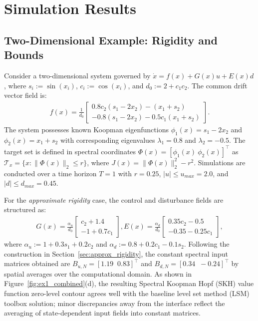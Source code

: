 \documentclass[letterpaper, 10 pt, conference]{ieeeconf}
\theoremstyle{plain}
\theoremstyle{definition}
\begin{document}
\section{Simulation Results}
\label{sec:simulations}


\subsection{Two-Dimensional Example: Rigidity and Bounds}
\label{sec:2D_example}

Consider a two-dimensional system governed by $\dot x = f(x) + G(x)u + E(x)d$, where $s_i := \sin(x_i)$, $c_i := \cos(x_i)$, and $d_0 := 2 + c_1 c_2$. The common drift vector field is:
\begin{align}
    f(x) = \frac{1}{d_0} 
    \begin{bmatrix} 
        0.8 c_2 (s_1 - 2x_2) - (x_1 + s_2) \\ 
        -0.8 (s_1 - 2x_2) - 0.5 c_1 (x_1 + s_2) 
    \end{bmatrix}.
\end{align}
The system possesses known Koopman eigenfunctions $\phi_1(x)=s_1 - 2x_2$ and $\phi_2(x)=x_1 + s_2$ with corresponding eigenvalues $\lambda_1=0.8$ and $\lambda_2=-0.5$. The target set is defined in spectral coordinates $\Phi(x) = [\phi_1(x)\ \phi_2(x)]^\top$ as $\mathcal{T}_x=\{x:\|\Phi(x)\|_2\le r\}$, where $J(x)=\|\Phi(x)\|_2^2-r^2$. Simulations are conducted over a time horizon $T=1$ with $r=0.25$, $|u|\le u_{max} = 2.0$, and $|d|\le d_{max} = 0.45$.

For the \textit{approximate rigidity} case, the control and disturbance fields are structured as:
\begin{align*}
    G(x) = \frac{\alpha_u}{d_0}
    \begin{bmatrix} 
        c_2 + 1.4 \\ 
        -1 + 0.7 c_1 
    \end{bmatrix}, 
    E(x) = \frac{\alpha_d}{d_0}
    \begin{bmatrix} 
        0.35 c_2 - 0.5 \\ 
        -0.35 - 0.25 c_1 
    \end{bmatrix},
\end{align*}
where $\alpha_u := 1 + 0.3 s_1 + 0.2 c_2$ and $\alpha_d := 0.8 + 0.2 c_1 - 0.1 s_2$. Following the construction in Section~\ref{sec:approx_rigidity}, the constant spectral input matrices obtained are $B_{u,N} = [1.19\;\; 0.83]^\top$ and $B_{d,N} = [0.34\;\; -0.24]^\top$ by spatial averages over the computational domain. As shown in Figure~\ref{fig:ex1_combined}(d), the resulting Spectral Koopman Hopf (SKH) value function zero-level contour agrees well with the baseline level set method (LSM) toolbox \cite{mitchell2005toolbox} solution; minor discrepancies away from the interface reflect the averaging of state-dependent input fields into constant matrices.
\end{document}
